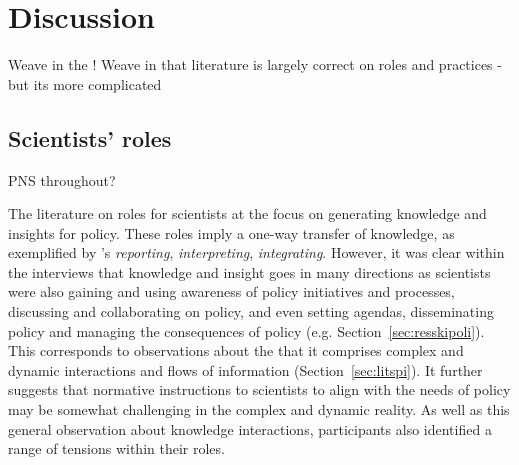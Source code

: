 \chapter{Discussion}\label{ch:discussion}


Weave in the \IDM!
Weave in that literature is largely correct on roles and practices - but its more complicated
\section{Scientists' roles}\label{sec:disroles}
PNS throughout?

The literature on roles for scientists at the \SPI{} focus on generating knowledge and insights for policy. These roles imply a one-way transfer of knowledge, as exemplified by \textcite{SteelLLS2004}'s \emph{reporting}, \emph{interpreting}, \emph{integrating}. However, it was clear within the interviews that knowledge and insight goes in many directions as scientists were also gaining and using awareness of policy initiatives and processes, discussing and collaborating on policy, and even setting agendas, disseminating policy and managing the consequences of policy (e.g. Section~\ref{sec:resskipoli}). This corresponds to observations about the \SPI{} that it comprises complex and dynamic interactions and flows of information (Section~\ref{sec:litspi}). It further suggests that normative instructions to scientists to align with the needs of policy may be somewhat challenging in the complex and dynamic reality. As well as this general observation about knowledge interactions, participants also identified a range of tensions within their roles. 

